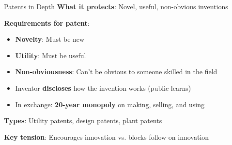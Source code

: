 \documentclass[aspectratio=169]{beamer}
\begin{document}
\begin{frame}{Patents in Depth}
\textbf{What it protects}: Novel, useful, non-obvious inventions

\vspace{0.2cm}
\textbf{Requirements for patent}:
\begin{itemize}
    \item \textbf{Novelty}: Must be new
    \item \textbf{Utility}: Must be useful
    \item \textbf{Non-obviousness}: Can't be obvious to someone skilled in the field
\end{itemize}

\vspace{0.3cm}
\begin{casestudybox}
\begin{itemize}
    \item Inventor \textbf{discloses} how the invention works (public learns)
    \item In exchange: \textbf{20-year monopoly} on making, selling, and using
\end{itemize}
\end{casestudybox}

\vspace{0.2cm}
\textbf{Types}: Utility patents, design patents, plant patents

\textbf{Key tension}: Encourages innovation vs. blocks follow-on innovation
\end{frame}
\end{document}
